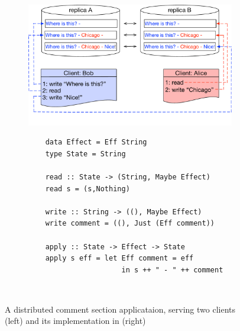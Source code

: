\begin{figure}[t]
        \centering
	\begin{subfigure}[b]{0.54\textwidth}
	\includegraphics[scale=0.36]{Figures/comment_application.pdf}
	\label{comment_example}
	\end{subfigure} 
	\begin{subfigure}[b]{0.45\textwidth}
	\begin{lstlisting}
	data Effect = Eff String 
	type State = String 

	read :: State -> (String, Maybe Effect)
	read s = (s,Nothing)

	write :: String -> ((), Maybe Effect)
	write comment = ((), Just (Eff comment))

	apply :: State -> Effect -> State 
	apply s eff = let Eff comment = eff
		        	  in s ++ " - " ++ comment
	\end{lstlisting}
	\label{subfig:comment_code}
	\end{subfigure}
\\ \hrulefill
\caption{A distributed comment section applicataion, serving two clients
(left) and its implementation in \tool (right)}
\label{fig:comment_app}
\end{figure}


